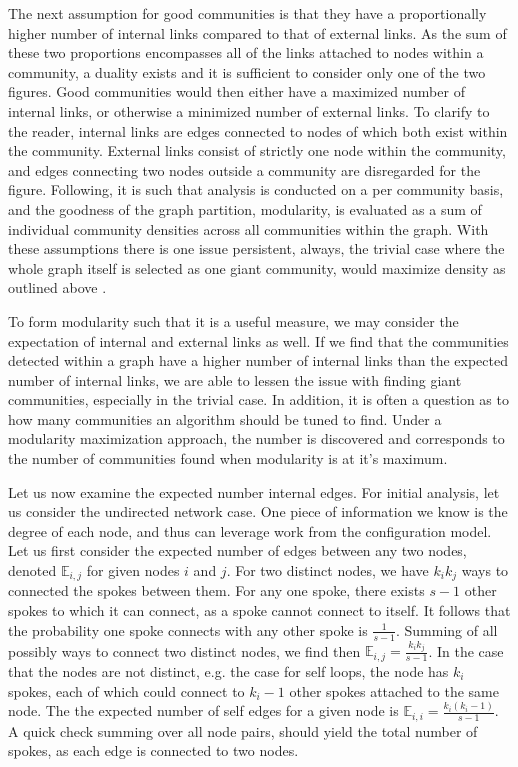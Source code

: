 \documentclass[a4paper, 10pt, twocolumn]{article}
\begin{document}
The next assumption for good communities is that they have a proportionally higher number of internal links compared to that of external links.
As the sum of these two proportions encompasses all of the links attached to nodes within a community, a duality exists and it is sufficient to consider only one of the two figures.
Good communities would then either have a maximized number of internal links, or otherwise a minimized number of external links.
To clarify to the reader, internal links are edges connected to nodes of which both exist within the community.
External links consist of strictly one node within the community, and edges connecting two nodes outside a community are disregarded for the figure.
Following, it is such that analysis is conducted on a per community basis, and the goodness of the graph partition, modularity, is evaluated as a sum of individual community densities across all communities within the graph.
With these assumptions there is one issue persistent, always, the trivial case where the whole graph itself is selected as one giant community, would maximize density as outlined above \cite{finding_comm_struct}.

To form modularity such that it is a useful measure, we may consider the expectation of internal and external links as well.
If we find that the communities detected within a graph have a higher number of internal links than the expected number of internal links, we are able to lessen the issue with finding giant communities, especially in the trivial case.
In addition, it is often a question as to how many communities an algorithm should be tuned to find.
Under a modularity maximization approach, the number is discovered and corresponds to the number of communities found when modularity is at it's maximum.

Let us now examine the expected number internal edges.
For initial analysis, let us consider the undirected network case.
One piece of information we know is the degree of each node, and thus can leverage work from the configuration model.
Let us first consider the expected number of edges between any two nodes, denoted $ \mathbb{E}_{i, j} $ for given nodes $ i $ and $ j $.
For two distinct nodes, we have $ k_{i} k_{j} $ ways to connected the spokes between them.
For any one spoke, there exists $ s - 1 $ other spokes to which it can connect, as a spoke cannot connect to itself.
It follows that the probability one spoke connects with any other spoke is $ \frac{1}{s - 1} $.
Summing of all possibly ways to connect two distinct nodes, we find then $ \mathbb{E}_{i, j} = \frac{k_{i} k_{j}}{s - 1} $.
In the case that the nodes are not distinct, e.g. the case for self loops, the node has $ k_{i} $ spokes, each of which could connect to $ k_{i} - 1 $ other spokes attached to the same node.
The the expected number of self edges for a given node is $ \mathbb{E}_{i, i} = \frac{k_{i} (k_{i} - 1)}{s - 1} $.
A quick check summing over all node pairs, should yield the total number of spokes, as each edge is connected to two nodes.
\end{document}
